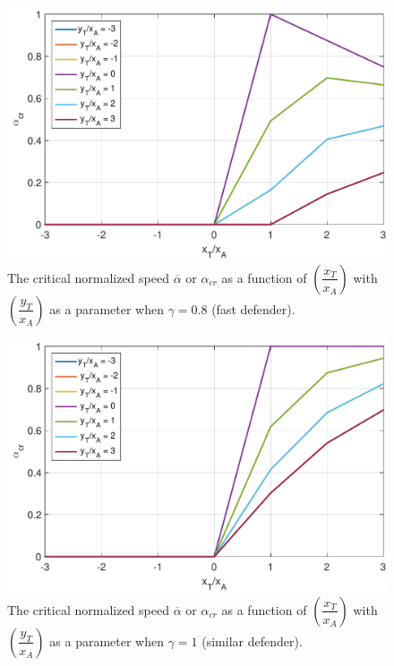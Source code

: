 \begin{figure}[htb]
\centering
\includegraphics[scale = 0.6]{fig/alphaCRg_0p8.pdf}
\caption{The critical normalized speed $\overline{\alpha}$ or $\alpha_{cr}$ as a function of $(\dfrac{x_T}{x_A})$ with $(\dfrac{y_T}{x_A})$ as a parameter when $\gamma=0.8$ (fast defender).}
\label{alphaCRgamma=0.8}
\end{figure}


\begin{figure}[htb]
\centering
\includegraphics[scale = 0.6]{fig/alphaCRg_1.pdf}
\caption{The critical normalized speed $\overline{\alpha}$ or $\alpha_{cr}$ as a function of $(\dfrac{x_T}{x_A})$ with $(\dfrac{y_T}{x_A})$ as a parameter when $\gamma=1$ (similar defender).}
\label{alphaCRgamma=1}
\end{figure}



